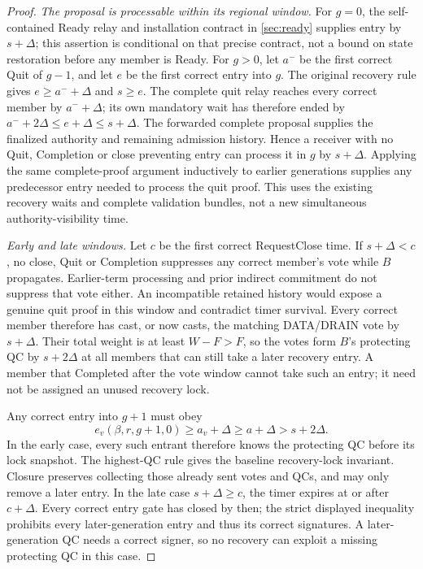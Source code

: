 \begin{proof}
\emph{The proposal is processable within its regional window.}
For $g=0$, the self-contained Ready relay and installation contract
in \cref{sec:ready} supplies entry by $s+\Delta$; this assertion is
conditional on that precise contract, not a bound on state restoration
before any member is Ready. For $g>0$, let $a^-$ be the first correct
Quit of $g-1$, and let $e$ be the first correct entry into $g$.
The original recovery rule gives $e\ge a^-+\Delta$ and $s\ge e$.
The complete quit relay reaches every correct member by $a^-+\Delta$;
its own mandatory wait has therefore ended by
$a^-+2\Delta\le e+\Delta\le s+\Delta$. The forwarded complete
proposal supplies the finalized authority and remaining admission
history. Hence a receiver with no Quit, Completion or close preventing
entry can process it in $g$ by $s+\Delta$. Applying the same
complete-proof argument inductively to earlier generations supplies
any predecessor entry needed to process the quit proof. This uses
the existing recovery waits and complete validation bundles, not a
new simultaneous authority-visibility time.

\emph{Early and late windows.}
Let $c$ be the first correct RequestClose time. If $s+\Delta<c$,
no close, Quit or Completion suppresses any correct member's vote
while $B$ propagates. Earlier-term processing and prior indirect
commitment do not suppress that vote either. An incompatible retained
history would expose a genuine quit proof in this window and contradict
timer survival. Every correct member therefore has cast, or now casts,
the matching DATA/DRAIN vote by $s+\Delta$. Their total weight is at least
$W-F>F$, so the votes form $B$'s protecting QC by $s+2\Delta$ at
all members that can still take a later recovery entry. A member that
Completed after the vote window cannot take such an entry; it need
not be assigned an unused recovery lock.

Any correct entry into $g+1$ must obey
\[
 e_v(\beta,r,g+1,0)\ge a_v+\Delta
 \ge a+\Delta>s+2\Delta.
\]
In the early case, every such entrant therefore knows the protecting
QC before its lock snapshot. The highest-QC rule gives the baseline
recovery-lock invariant. Closure preserves collecting those already
sent votes and QCs, and may only remove a later entry. In the late
case $s+\Delta\ge c$, the timer expires at or after $c+\Delta$.
Every correct entry gate has closed by then; the strict displayed
inequality prohibits every later-generation entry and thus its
correct signatures. A later-generation QC needs a correct signer,
so no recovery can exploit a missing protecting QC in this case.


\end{proof}
